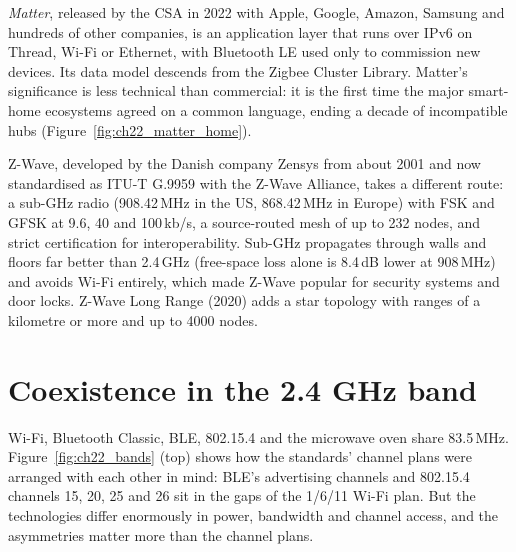 \emph{Matter}, released by the CSA in 2022 with Apple, Google, Amazon, Samsung and hundreds of other
companies, is an application layer that runs over IPv6 on Thread, Wi-Fi or Ethernet, with Bluetooth
LE used only to commission new devices. Its data model descends from the Zigbee Cluster Library.
Matter's significance is less technical than commercial: it is the first time the major smart-home
ecosystems agreed on a common language, ending a decade of incompatible hubs (Figure~\ref{fig:ch22_matter_home}).

\begin{inpractice}
Z-Wave, developed by the Danish company Zensys from about 2001 and now standardised as ITU-T G.9959
with the Z-Wave Alliance, takes a different route: a sub-GHz radio (908.42\,MHz in the US,
868.42\,MHz in Europe) with FSK and GFSK at 9.6, 40 and 100\,kb/s, a source-routed mesh of up to 232
nodes, and strict certification for interoperability. Sub-GHz propagates through walls and floors far
better than 2.4\,GHz (free-space loss alone is 8.4\,dB lower at 908\,MHz) and avoids Wi-Fi entirely,
which made Z-Wave popular for security systems and door locks. Z-Wave Long Range (2020) adds a star
topology with ranges of a kilometre or more and up to 4000 nodes.
\end{inpractice}

\section{Coexistence in the 2.4 GHz band}
\label{sec:ch22:coex}

Wi-Fi, Bluetooth Classic, BLE, 802.15.4 and the microwave oven share 83.5\,MHz.
Figure~\ref{fig:ch22_bands} (top) shows how the standards' channel plans were arranged with each
other in mind: BLE's advertising channels and 802.15.4 channels 15, 20, 25 and 26 sit in the gaps of
the 1/6/11 Wi-Fi plan. But the technologies differ enormously in power, bandwidth and channel access,
and the asymmetries matter more than the channel plans.


